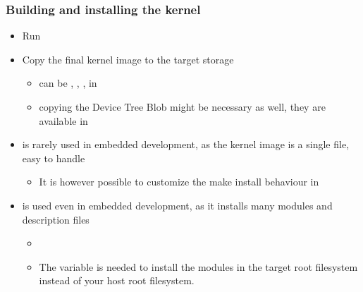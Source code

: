 \begin{frame}
  \frametitle{Building and installing the kernel}
  \begin{itemize}
  \item Run 
  \item Copy the final kernel image to the target storage
    \begin{itemize}
    \item can be , , ,
       in 
    \item copying the Device Tree Blob might be necessary as well,
      they are available in 
    \end{itemize}
  \item {} is rarely used in embedded development, as the
    kernel image is a single file, easy to handle
    \begin{itemize}
    \item It is however possible to customize the make install
      behaviour in 
    \end{itemize}
  \item {} is used even in embedded
    development, as it installs many modules and description files
    \begin{itemize}
    \item {}
    \item The  variable is needed to install
      the modules in the target root filesystem instead of your host
      root filesystem.
    \end{itemize}
  \end{itemize}
\end{frame}

